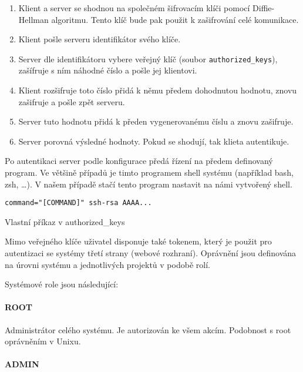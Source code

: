 \begin{enumerate}
    \item Klient a server se shodnou na společném šifrovacím klíči pomocí Diffie-Hellman algoritmu.
    Tento klíč bude pak použit k zašifrování celé komunikace.
    \item Klient pošle serveru identifikátor svého klíče.
    \item Server dle identifikátoru vybere veřejný klíč (soubor \verb|authorized_keys|), zašífruje s ním náhodné číslo a pošle jej klientovi.
    \item Klient rozšifruje toto číslo přidá k němu předem dohodnutou hodnotu, znovu zašifruje a pošle zpět serveru.
    \item Server tuto hodnotu přidá k předen vygenerovanému číslu a znovu zašifruje.
    \item Server porovná výsledné hodnoty. Pokud se shodují, tak klieta autentikuje.
\end{enumerate}

Po autentikaci server podle konfigurace předá řízení na předem definovaný program.
Ve většině případů je timto programem shell systému (například bash, zsh, \ldots).
V našem případě stačí tento program nastavit na námi vytvořený shell.

\begin{listing}[ht]
\begin{verbatim}
command="[COMMAND]" ssh-rsa AAAA...
\end{verbatim}
\caption{Vlastní příkaz v authorized\_keys}
\end{listing}

Mimo veřejného klíče uživatel disponuje také tokenem, který je použit pro autentizaci se systémy třetí strany (webové rozhraní).
Oprávnění jsou definována na úrovni systému a jednotlivých projektů v podobě rolí.

\noindent\makebox[\linewidth]{\rule{\textwidth}{0.4pt}}

Systémové role jsou následující:

\paragraph{ROOT}

Administrátor celého systému.
Je autorizován ke všem akcím.
Podobnost s root oprávněním v Unixu.

\paragraph{ADMIN}

